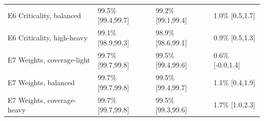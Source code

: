 \begin{table}[t]
\begin{tabular}{p{1.47in}p{1.47in}p{1.47in}p{1.47in}}
E6 Criticality, balanced & 99.5\% [99.4,99.7] & 99.2\% [99.1,99.4] & 1.0\% [0.5,1.7] \\
E6 Criticality, high-heavy & 99.1\% [98.9,99.3] & 98.9\% [98.6,99.1] & 0.9\% [0.5,1.3] \\
E7 Weights, coverage-light & 99.7\% [99.7,99.8] & 99.5\% [99.4,99.6] & 0.6\% [-0.0,1.4] \\
E7 Weights, balanced & 99.7\% [99.7,99.8] & 99.5\% [99.4,99.7] & 1.1\% [0.4,1.9] \\
E7 Weights, coverage-heavy & 99.7\% [99.7,99.8] & 99.5\% [99.3,99.6] & 1.7\% [1.0,2.3] \\
\bottomrule
\end{tabular}
\end{table}
